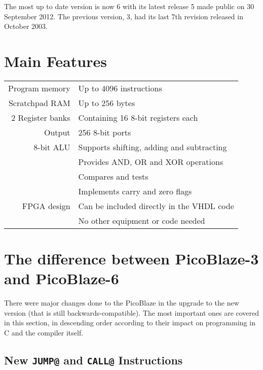 The most up to date version is now 6 with its latest release 5 made public on 30 September 2012. The previous version, 3, had its last 7th revision released in October 2003. %

    \section{Main Features}

    \begin{center}
    \begin{tabular}{ @{\extracolsep{\fill} } r | l }
        Program memory & Up to 4096 instructions \\

        Scratchpad RAM & Up to 256 bytes \\

        2 Register banks & Containing 16 8-bit registers each\\

        Output & 256 8-bit ports \\

        8-bit ALU & Supports shifting, adding and subtracting \\
                  & Provides AND, OR and XOR operations \\
                  & Compares and tests \\
                  & Implements carry and zero flags \\

        FPGA design & Can be included directly in the VHDL code \\
                    & No other equipment or code needed \\
    \end{tabular}
    \end{center}

    \section{The difference between PicoBlaze-3 and PicoBlaze-6}

    There were major changes done to the PicoBlaze in the upgrade to the new version (that is still backwards-compatible). 
    The most important ones are covered in this section, in descending order according to their impact on programming in C and the compiler itself.

        \subsection{New \texttt{JUMP@} and \texttt{CALL@} Instructions}

